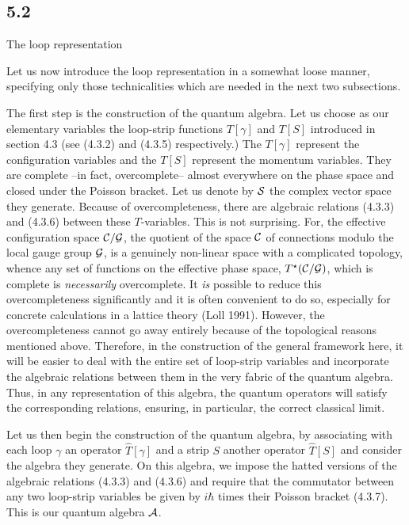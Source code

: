\goodbreak
\subsection{5.2}{The loop representation}%

Let us now introduce the loop representation in a somewhat loose manner,
specifying only those technicalities which are needed in the next two
subsections.

The first step is the construction of the quantum algebra. Let us choose
as our elementary variables the loop-strip functions $T[\gamma ]$ and $T[S]$
introduced in section 4.3 (see (4.3.2) and (4.3.5) respectively.) The
$T[\gamma ]$ represent the configuration variables and the $T[S]$ represent
the momentum variables. They are complete --in fact, overcomplete-- almost
everywhere on the phase space and closed under the Poisson bracket. Let us
denote by ${\cal S}$ the complex vector space they generate. Because of
overcompleteness, there are algebraic relations (4.3.3) and (4.3.6) between
these $T$-variables. This is not surprising. For, the
effective configuration space ${\cal C}/{\cal G}$, the quotient of the
space ${\cal C}$ of connections modulo the local gauge group ${\cal G}$,
is a genuinely non-linear space with a complicated topology, whence any set of
functions on the effective phase space, $T^\star({\cal C}/{\cal G})$,
which is complete is {\it necessarily} overcomplete. It {\it is} possible
to reduce this overcompleteness significantly and it is often convenient to
do so, especially for concrete calculations in a lattice theory (Loll 1991).
However, the overcompleteness cannot go away entirely because of the
topological reasons mentioned above. Therefore, in the construction of the
general framework here, it will be easier to deal with the entire set of
loop-strip variables and incorporate the algebraic relations between them in
the very fabric of the quantum algebra. Thus, in any representation of this
algebra, the quantum operators will satisfy the corresponding relations,
ensuring, in particular, the correct classical limit.

Let us then begin the construction of the quantum algebra, by associating
with each loop $\gamma$ an operator $\hat{T}[\gamma ]$ and a strip $S$ another
operator $\hat{T}[S]$ and consider the algebra they generate. On this algebra,
we impose the hatted versions of the algebraic relations (4.3.3) and
(4.3.6) and require that the commutator between any two loop-strip
variables be given by $i\hbar$ times their Poisson bracket (4.3.7). This
is our quantum algebra ${\cal A}$.

